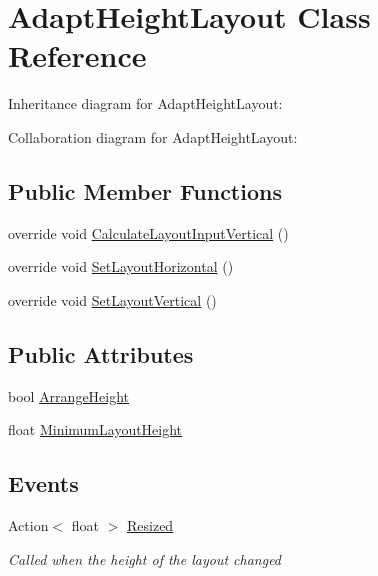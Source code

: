 \hypertarget{class_adapt_height_layout}{}\section{Adapt\+Height\+Layout Class Reference}
\label{class_adapt_height_layout}


Inheritance diagram for Adapt\+Height\+Layout\+:


Collaboration diagram for Adapt\+Height\+Layout\+:
\subsection*{Public Member Functions}
\begin{DoxyCompactItemize}
\item 
override void \hyperlink{class_adapt_height_layout_a3fc85e9fbfd2d01044a9ef1b6c953131}{Calculate\+Layout\+Input\+Vertical} ()
\item 
override void \hyperlink{class_adapt_height_layout_aafc36f42a70d460d35619b5024269460}{Set\+Layout\+Horizontal} ()
\item 
override void \hyperlink{class_adapt_height_layout_a4c759ec3b551b66055abf463c92a68e1}{Set\+Layout\+Vertical} ()
\end{DoxyCompactItemize}
\subsection*{Public Attributes}
\begin{DoxyCompactItemize}
\item 
bool \hyperlink{class_adapt_height_layout_a8f9f7bd6ffb287526031e84152bf01a6}{Arrange\+Height}
\item 
float \hyperlink{class_adapt_height_layout_ac867333b5e74e0e67b0014eaf5fb7105}{Minimum\+Layout\+Height}
\end{DoxyCompactItemize}
\subsection*{Events}
\begin{DoxyCompactItemize}
\item 
Action$<$ float $>$ \hyperlink{class_adapt_height_layout_a47821908008228db52d74048bb16d96a}{Resized}
\begin{DoxyCompactList}\small\item\em Called when the height of the layout changed \end{DoxyCompactList}\end{DoxyCompactItemize}


